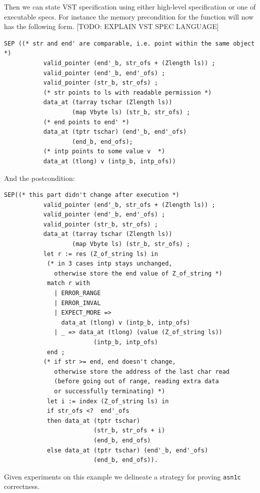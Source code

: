 \documentclass[acmsmall,nonacm]{acmart}
\begin{document}
Then we can state VST specification using either high-level specification or one of executable specs. For instance the memory precondition for the function will now has the following form. [TODO: EXPLAIN VST SPEC LANGUAGE]
\begin{lstlisting}[language=Coq]
SEP ((* str and end' are comparable, i.e. point within the same object *)
           valid_pointer (end'_b, str_ofs + (Zlength ls)) ;
           valid_pointer (end'_b, end'_ofs) ;
           valid_pointer (str_b, str_ofs) ;
           (* str points to ls with readable permission *)
           data_at (tarray tschar (Zlength ls)) 
                   (map Vbyte ls) (str_b, str_ofs) ; 
           (* end points to end' *)
           data_at (tptr tschar) (end'_b, end'_ofs) 
                   (end_b, end_ofs);
           (* intp points to some value v  *)
           data_at (tlong) v (intp_b, intp_ofs))
           \end{lstlisting}

And the postcondition:
           
\begin{lstlisting}[language=Coq]
 SEP((* this part didn't change after execution *)
           valid_pointer (end'_b, str_ofs + (Zlength ls)) ;
           valid_pointer (end'_b, end'_ofs) ;
           valid_pointer (str_b, str_ofs) ;
           data_at (tarray tschar (Zlength ls)) 
                   (map Vbyte ls) (str_b, str_ofs) ; 
           let r := res (Z_of_string ls) in
            (* in 3 cases intp stays unchanged,
              otherwise store the end value of Z_of_string *)
            match r with 
              | ERROR_RANGE 
              | ERROR_INVAL 
              | EXPECT_MORE => 
                data_at (tlong) v (intp_b, intp_ofs)
              | _ => data_at (tlong) (value (Z_of_string ls))
                         (intp_b, intp_ofs) 
            end ;
           (* if str >= end, end doesn't change, 
              otherwise store the address of the last char read 
              (before going out of range, reading extra data 
              or successfully terminating) *)
            let i := index (Z_of_string ls) in
            if str_ofs <?  end'_ofs
            then data_at (tptr tschar) 
                         (str_b, str_ofs + i) 
                         (end_b, end_ofs)
            else data_at (tptr tschar) (end'_b, end'_ofs) 
                         (end_b, end_ofs)).
\end{lstlisting}

Given experiments on this example we delineate a strategy for proving \texttt{asn1c} correctness.
\end{document}
